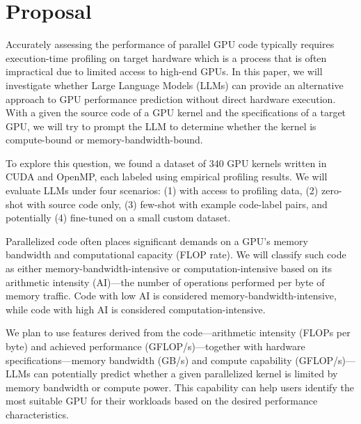\documentclass[conference]{IEEEtran}
\begin{document}
\section{Proposal}

Accurately assessing the performance of parallel GPU code typically requires execution-time profiling on target hardware which is a process that is often impractical due to limited access to high-end GPUs. In this paper, we will investigate whether Large Language Models (LLMs) can provide an alternative approach to GPU performance prediction without direct hardware execution. With a given the source code of a GPU kernel and the specifications of a target GPU, we will try to prompt the LLM to determine whether the kernel is compute-bound or memory-bandwidth-bound.

To explore this question, we found a dataset of 340 GPU kernels written in CUDA and OpenMP, each labeled using empirical profiling results. We will evaluate LLMs under four scenarios: (1) with access to profiling data, (2) zero-shot with source code only, (3) few-shot with example code-label pairs, and potentially (4) fine-tuned on a small custom dataset.

Parallelized code often places significant demands on a GPU’s memory bandwidth and computational capacity (FLOP rate). We will classify such code as either memory-bandwidth-intensive or computation-intensive based on its arithmetic intensity (AI)—the number of operations performed per byte of memory traffic. Code with low AI is considered memory-bandwidth-intensive, while code with high AI is considered computation-intensive.

We plan to use features derived from the code—arithmetic intensity (FLOPs per byte) and achieved performance (GFLOP/s)—together with hardware specifications—memory bandwidth (GB/s) and compute capability (GFLOP/s)—LLMs can potentially predict whether a given parallelized kernel is limited by memory bandwidth or compute power. This capability can help users identify the most suitable GPU for their workloads based on the desired performance characteristics.



\end{document}
